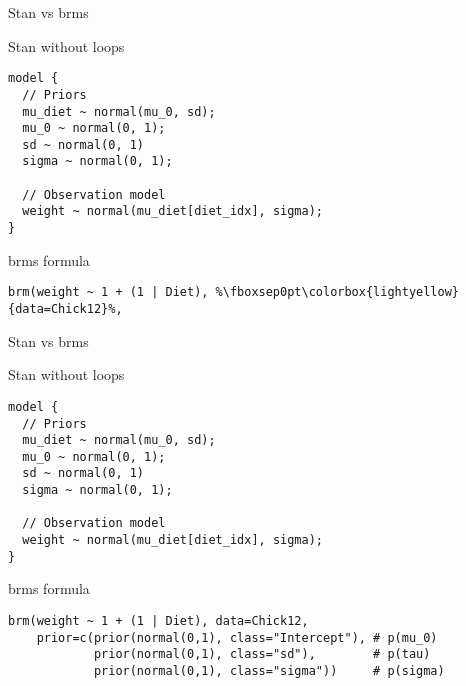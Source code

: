 \documentclass[finnish,english,t]{beamer}
\begin{document}
\begin{frame}[fragile]{Stan vs brms}

  \vspace{-0.5\baselineskip}

  Stan without loops
  
{\small
\begin{verbatim}
model {
  // Priors
  mu_diet ~ normal(mu_0, sd);
  mu_0 ~ normal(0, 1);
  sd ~ normal(0, 1)
  sigma ~ normal(0, 1);
  
  // Observation model
  weight ~ normal(mu_diet[diet_idx], sigma);
}
\end{verbatim}

  brms formula
\begin{verbatim}
brm(weight ~ 1 + (1 | Diet), %\fboxsep0pt\colorbox{lightyellow}{data=Chick12}%,
\end{verbatim}
}

\end{frame}

\begin{frame}[fragile]{Stan vs brms}

  \vspace{-0.5\baselineskip}

  Stan without loops
  
{\small
\begin{verbatim}
model {
  // Priors
  mu_diet ~ normal(mu_0, sd);
  mu_0 ~ normal(0, 1);
  sd ~ normal(0, 1)
  sigma ~ normal(0, 1);
  
  // Observation model
  weight ~ normal(mu_diet[diet_idx], sigma);
}
\end{verbatim}

  brms formula
\begin{verbatim}
brm(weight ~ 1 + (1 | Diet), data=Chick12,
    prior=c(prior(normal(0,1), class="Intercept"), # p(mu_0)
            prior(normal(0,1), class="sd"),        # p(tau)
            prior(normal(0,1), class="sigma"))     # p(sigma)
\end{verbatim}
}

\end{frame}
\end{document}
